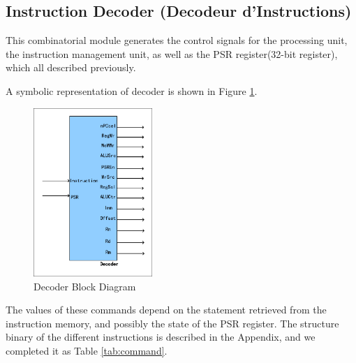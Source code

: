 \subsection{Instruction Decoder (Decodeur d’Instructions)}
\label{sec:Instruction Decoder}

This combinatorial module generates the control signals for 
the processing unit, the instruction management unit, 
as well as the PSR register(32-bit register), which all described
previously.

A symbolic representation of decoder
is shown in Figure \ref{fig:decoder}.

\begin{figure}[htp]
    \centering
    \includegraphics[width=0.4\textwidth]{picture/decoder.pdf}
    \caption{Decoder Block Diagram}     
    \label{fig:decoder}
\end{figure}

The values of these commands depend on the statement retrieved from 
the instruction memory, and possibly the state of the PSR register. 
The structure binary of the different instructions is described 
in the Appendix, and we completed it as Table \ref{tab:command}.

